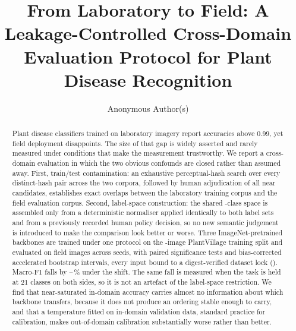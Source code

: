 \documentclass[runningheads]{llncs}
\begin{document}
\title{From Laboratory to Field: A Leakage-Controlled Cross-Domain
Evaluation Protocol for Plant Disease Recognition}

\author{Anonymous Author(s)}

\maketitle

\begin{abstract}
Plant disease classifiers trained on laboratory imagery report accuracies above
$0.99$, yet field deployment disappoints. The size of that gap is widely
asserted and rarely measured under conditions that make the measurement
trustworthy. We report a cross-domain evaluation in which the two obvious
confounds are closed rather than assumed away. First, train/test contamination:
an exhaustive perceptual-hash search over every distinct-hash pair across the
two corpora, followed by human adjudication of all \NLeakNearCore{} near
candidates, establishes \NLeakExactCore{} exact overlaps between the laboratory
training corpus and the field evaluation corpus. Second, label-space
construction: the shared \NSharedClasses{}-class space is assembled only from a
deterministic normaliser applied identically to both label sets and from a
previously recorded human policy decision, so no new semantic judgement is
introduced to make the comparison look better or worse. Three
ImageNet-pretrained backbones are trained under one protocol on the
\NPvTrain{}-image PlantVillage training split and evaluated on \NXdImages{}
field images across \NSeedsDone{} seeds, with paired significance tests and
bias-corrected accelerated bootstrap intervals, every input bound to a
digest-verified dataset lock (\LockDigest{}). Macro-F1 falls by
\RelDropFMeanRn{}--\RelDropFMeanMn{}\,\% under the shift.
The same fall is measured when the task is held at 21 classes on both sides, so
it is not an artefact of the label-space restriction.
We find that
near-saturated in-domain accuracy carries almost no information about which
backbone transfers, because it does not produce an ordering stable enough to
carry, and that a temperature fitted on in-domain validation data, standard
practice for calibration, makes out-of-domain calibration substantially worse
rather than better.

\end{abstract}
\end{document}
